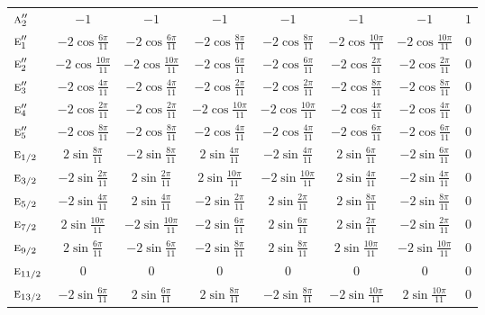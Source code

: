 \documentclass[10pt,a4paper]{article}
\makeatletter
\def\grouprule#1#2{\noalign{\marks\LTgroupmarks{\the\belowrulesep}\nobreak\vskip#1%
  \vskip\aboverulesep}\multispan\LT@cols\unskip{\leaders\hrule\@height#2\hfill\kern\z@}\cr
  \noalign{\penalty\LTrulebreak\vskip\belowrulesep\global\@lastruleclass\z@}}
\numberwithin{equation}{section}
\newcommand{\irr}[1]{\text{\normalfont\scshape #1}}
\makeatother
\begin{document}
{{\begin{longtable}{@{}lccccccc@{}}
$\irr{a}_{2}''$ & $-1$ & $-1$ & $-1$ & $-1$ & $-1$ & $-1$ & $1$\\
$\irr{e}_{1}''$ & $-2\cos\tfrac{6\pi}{11}$ & $-2\cos\tfrac{6\pi}{11}$ & $-2\cos\tfrac{8\pi}{11}$ & $-2\cos\tfrac{8\pi}{11}$ & $-2\cos\tfrac{10\pi}{11}$ & $-2\cos\tfrac{10\pi}{11}$ & $0$\\
$\irr{e}_{2}''$ & $-2\cos\tfrac{10\pi}{11}$ & $-2\cos\tfrac{10\pi}{11}$ & $-2\cos\tfrac{6\pi}{11}$ & $-2\cos\tfrac{6\pi}{11}$ & $-2\cos\tfrac{2\pi}{11}$ & $-2\cos\tfrac{2\pi}{11}$ & $0$\\
$\irr{e}_{3}''$ & $-2\cos\tfrac{4\pi}{11}$ & $-2\cos\tfrac{4\pi}{11}$ & $-2\cos\tfrac{2\pi}{11}$ & $-2\cos\tfrac{2\pi}{11}$ & $-2\cos\tfrac{8\pi}{11}$ & $-2\cos\tfrac{8\pi}{11}$ & $0$\\
$\irr{e}_{4}''$ & $-2\cos\tfrac{2\pi}{11}$ & $-2\cos\tfrac{2\pi}{11}$ & $-2\cos\tfrac{10\pi}{11}$ & $-2\cos\tfrac{10\pi}{11}$ & $-2\cos\tfrac{4\pi}{11}$ & $-2\cos\tfrac{4\pi}{11}$ & $0$\\
$\irr{e}_{5}''$ & $-2\cos\tfrac{8\pi}{11}$ & $-2\cos\tfrac{8\pi}{11}$ & $-2\cos\tfrac{4\pi}{11}$ & $-2\cos\tfrac{4\pi}{11}$ & $-2\cos\tfrac{6\pi}{11}$ & $-2\cos\tfrac{6\pi}{11}$ & $0$\\
\grouprule{0pt}{\lightrulewidth}
$\irr{e}_{1/2}$ & $2\sin\tfrac{8\pi}{11}$ & $-2\sin\tfrac{8\pi}{11}$ & $2\sin\tfrac{4\pi}{11}$ & $-2\sin\tfrac{4\pi}{11}$ & $2\sin\tfrac{6\pi}{11}$ & $-2\sin\tfrac{6\pi}{11}$ & $0$\\
$\irr{e}_{3/2}$ & $-2\sin\tfrac{2\pi}{11}$ & $2\sin\tfrac{2\pi}{11}$ & $2\sin\tfrac{10\pi}{11}$ & $-2\sin\tfrac{10\pi}{11}$ & $2\sin\tfrac{4\pi}{11}$ & $-2\sin\tfrac{4\pi}{11}$ & $0$\\
$\irr{e}_{5/2}$ & $-2\sin\tfrac{4\pi}{11}$ & $2\sin\tfrac{4\pi}{11}$ & $-2\sin\tfrac{2\pi}{11}$ & $2\sin\tfrac{2\pi}{11}$ & $2\sin\tfrac{8\pi}{11}$ & $-2\sin\tfrac{8\pi}{11}$ & $0$\\
$\irr{e}_{7/2}$ & $2\sin\tfrac{10\pi}{11}$ & $-2\sin\tfrac{10\pi}{11}$ & $-2\sin\tfrac{6\pi}{11}$ & $2\sin\tfrac{6\pi}{11}$ & $2\sin\tfrac{2\pi}{11}$ & $-2\sin\tfrac{2\pi}{11}$ & $0$\\
$\irr{e}_{9/2}$ & $2\sin\tfrac{6\pi}{11}$ & $-2\sin\tfrac{6\pi}{11}$ & $-2\sin\tfrac{8\pi}{11}$ & $2\sin\tfrac{8\pi}{11}$ & $2\sin\tfrac{10\pi}{11}$ & $-2\sin\tfrac{10\pi}{11}$ & $0$\\
$\irr{e}_{11/2}$ & $0$ & $0$ & $0$ & $0$ & $0$ & $0$ & $0$\\
$\irr{e}_{13/2}$ & $-2\sin\tfrac{6\pi}{11}$ & $2\sin\tfrac{6\pi}{11}$ & $2\sin\tfrac{8\pi}{11}$ & $-2\sin\tfrac{8\pi}{11}$ & $-2\sin\tfrac{10\pi}{11}$ & $2\sin\tfrac{10\pi}{11}$ & $0$\\

\end{longtable}}}
\end{document}
